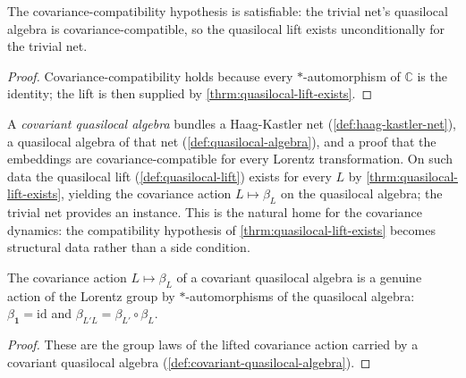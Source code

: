 \begin{theorem}
    \label{thrm:quasilocal-lift-trivial}
    \leanok
    The covariance-compatibility hypothesis is satisfiable: the trivial net's quasilocal algebra is covariance-compatible, so the quasilocal lift exists unconditionally for the trivial net.
\end{theorem}
\begin{proof}
    \leanok
    Covariance-compatibility holds because every $*$-automorphism of $\mathbb{C}$ is the identity; the lift is then supplied by \ref{thrm:quasilocal-lift-exists}.
\end{proof}

\begin{definition}
    \label{def:covariant-quasilocal-algebra}
    \leanok
    A \emph{covariant quasilocal algebra} bundles a Haag-Kastler net (\ref{def:haag-kastler-net}), a quasilocal algebra of that net (\ref{def:quasilocal-algebra}), and a proof that the embeddings are covariance-compatible for every Lorentz transformation. On such data the quasilocal lift (\ref{def:quasilocal-lift}) exists for every $L$ by \ref{thrm:quasilocal-lift-exists}, yielding the covariance action $L \mapsto \beta_L$ on the quasilocal algebra; the trivial net provides an instance. This is the natural home for the covariance dynamics: the compatibility hypothesis of \ref{thrm:quasilocal-lift-exists} becomes structural data rather than a side condition.
\end{definition}

\begin{lemma}
    \label{lmm:quasilocal-action-coherence}
    \leanok
    The covariance action $L \mapsto \beta_L$ of a covariant quasilocal algebra is a genuine action of the Lorentz group by $*$-automorphisms of the quasilocal algebra: $\beta_{\mathbf{1}} = \mathrm{id}$ and $\beta_{L'L} = \beta_{L'} \circ \beta_L$.
\end{lemma}
\begin{proof}
    \leanok
    These are the group laws of the lifted covariance action carried by a covariant quasilocal algebra (\ref{def:covariant-quasilocal-algebra}).
\end{proof}

